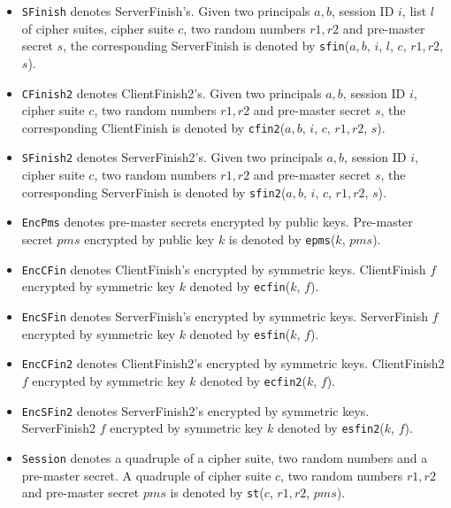 \documentclass[a4paper,fleqn]{cas-dc}
\begin{document}
\begin{itemize}
\item \verb!SFinish! denotes ServerFinish’s. Given two principals $a, b$, session ID $i$, list $l$ of cipher suites, cipher suite $c$, two random numbers $r1, r2$ and pre-master secret $s$, the corresponding ServerFinish is denoted by \verb!sfin!($a, b$, $i$, $l$, $c$, $r1, r2$, $s$).
\item \verb!CFinish2! denotes ClientFinish2’s. Given two principals $a, b$, session ID $i$, cipher suite $c$, two random numbers $r1, r2$ and pre-master secret $s$, the corresponding ClientFinish is denoted by \verb!cfin2!($a, b$, $i$, $c$, $r1, r2$, $s$).
\item \verb!SFinish2! denotes ServerFinish2’s. Given two principals $a, b$, session ID $i$, cipher suite $c$, two random numbers $r1, r2$ and pre-master secret $s$, the corresponding ServerFinish is denoted by \verb!sfin2!($a, b$, $i$, $c$, $r1, r2$, $s$).
\item \verb!EncPms! denotes pre-master secrets encrypted by public keys. Pre-master secret $pms$ encrypted by public key $k$ is denoted by \verb!epms!($k$, $pms$).
\item \verb!EncCFin! denotes ClientFinish’s encrypted by symmetric keys. ClientFinish $f$ encrypted by symmetric key $k$ denoted by \verb!ecfin!($k$, $f$).
\item \verb!EncSFin! denotes ServerFinish’s encrypted by symmetric keys. ServerFinish $f$ encrypted by symmetric key $k$ denoted by \verb!esfin!($k$, $f$).
\item \verb!EncCFin2! denotes ClientFinish2’s encrypted by symmetric keys. ClientFinish2 $f$ encrypted by symmetric key $k$ denoted by \verb!ecfin2!($k$, $f$).
\item \verb!EncSFin2! denotes ServerFinish2’s encrypted by symmetric keys. ServerFinish2 $f$ encrypted by symmetric key $k$ denoted by \verb!esfin2!($k$, $f$).
\item \verb!Session! denotes a quadruple of a cipher suite, two random numbers and a pre-master secret. A quadruple of cipher suite $c$, two random numbers $r1, r2$ and pre-master secret $pms$ is denoted by \verb!st!($c$, $r1, r2$, $pms$).
\end{itemize}
\end{document}
